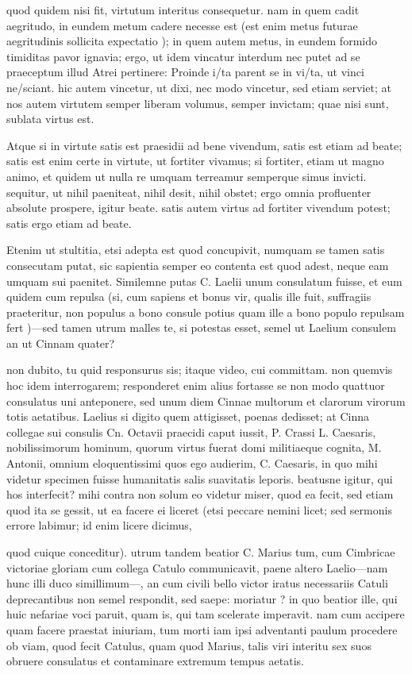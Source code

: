  quod quidem nisi fit, virtutum interitus consequetur. nam in quem cadit aegritudo, in eundem metum cadere necesse est (est enim metus futurae aegritudinis sollicita expectatio ); in quem autem metus, in eundem formido timiditas pavor ignavia; ergo, ut idem vincatur interdum nec putet ad se praeceptum illud Atrei pertinere: Proinde i/ta parent se in vi/ta, ut vinci ne/sciant. hic autem vincetur, ut dixi, nec modo vincetur, sed etiam serviet; at nos autem virtutem semper liberam volumus, semper invictam; quae nisi sunt, sublata virtus est.

 Atque si in virtute satis est praesidii ad bene vivendum, satis est etiam ad beate; satis est enim certe in virtute, ut fortiter vivamus; si fortiter, etiam ut magno animo, et quidem ut nulla re umquam terreamur semperque simus invicti. sequitur, ut nihil paeniteat, nihil desit, nihil obstet; ergo omnia profluenter absolute prospere, igitur beate. satis autem virtus ad fortiter vivendum potest; satis ergo etiam ad beate.

 Etenim ut stultitia, etsi adepta est quod concupivit, numquam se tamen satis consecutam putat, sic sapientia semper eo contenta est quod adest, neque eam umquam sui paenitet. Similemne putas C. Laelii unum consulatum fuisse, et eum quidem cum repulsa (si, cum sapiens et bonus vir, qualis ille fuit, suffragiis praeteritur, non populus a bono consule potius quam ille a bono populo repulsam fert )—sed tamen utrum malles te, si potestas esset, semel ut Laelium consulem an ut Cinnam quater?

 non dubito, tu quid responsurus sis; itaque video, cui committam. non quemvis hoc idem interrogarem; responderet enim alius fortasse se non modo quattuor consulatus uni anteponere, sed unum diem Cinnae multorum et clarorum virorum totis aetatibus. Laelius si digito quem attigisset, poenas dedisset; at Cinna collegae sui consulis Cn. Octavii praecidi caput iussit, P. Crassi L. Caesaris, nobilissimorum hominum, quorum virtus fuerat domi militiaeque cognita, M. Antonii, omnium eloquentissimi quos ego audierim, C. Caesaris, in quo mihi videtur specimen fuisse humanitatis salis suavitatis leporis. beatusne igitur, qui hos interfecit? mihi contra non solum eo videtur miser, quod ea fecit, sed etiam quod ita se gessit, ut ea facere ei liceret (etsi peccare nemini licet; sed sermonis errore labimur; id enim licere dicimus,

 quod cuique conceditur). utrum tandem beatior C. Marius tum, cum Cimbricae victoriae gloriam cum collega Catulo communicavit, paene altero Laelio—nam hunc illi duco simillimum—, an cum civili bello victor iratus necessariis Catuli deprecantibus non semel respondit, sed saepe: moriatur ? in quo beatior ille, qui huic nefariae voci paruit, quam is, qui tam scelerate imperavit. nam cum accipere quam facere praestat iniuriam, tum morti iam ipsi adventanti paulum procedere ob viam, quod fecit Catulus, quam quod Marius, talis viri interitu sex suos obruere consulatus et contaminare extremum tempus aetatis.

